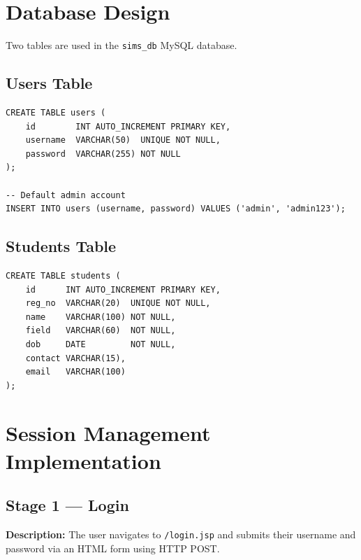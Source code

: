 \documentclass[12pt, a4paper]{article}
\begin{document}
\section{Database Design}

Two tables are used in the \texttt{sims\_db} MySQL database.

\subsection{Users Table}

\begin{lstlisting}[style=sqlstyle, caption={users table DDL}]
CREATE TABLE users (
    id        INT AUTO_INCREMENT PRIMARY KEY,
    username  VARCHAR(50)  UNIQUE NOT NULL,
    password  VARCHAR(255) NOT NULL
);

-- Default admin account
INSERT INTO users (username, password) VALUES ('admin', 'admin123');
\end{lstlisting}

\subsection{Students Table}

\begin{lstlisting}[style=sqlstyle, caption={students table DDL}]
CREATE TABLE students (
    id      INT AUTO_INCREMENT PRIMARY KEY,
    reg_no  VARCHAR(20)  UNIQUE NOT NULL,
    name    VARCHAR(100) NOT NULL,
    field   VARCHAR(60)  NOT NULL,
    dob     DATE         NOT NULL,
    contact VARCHAR(15),
    email   VARCHAR(100)
);
\end{lstlisting}

\section{Session Management Implementation}

\subsection{Stage 1 --- Login}

\textbf{Description:} The user navigates to \texttt{/login.jsp} and submits
their username and password via an HTML form using HTTP POST.
\end{document}
